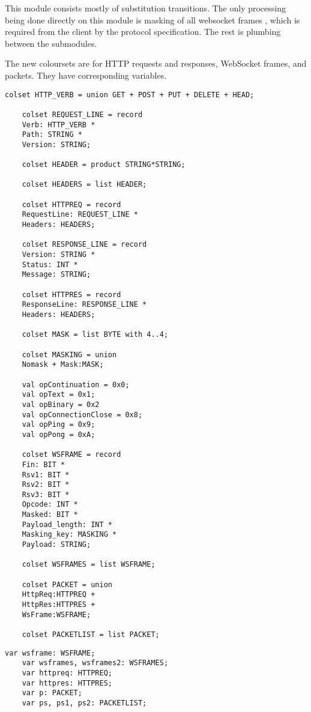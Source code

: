 	This module consists mostly of substitution transitions. The only processing
	being done directly on this module is masking of all websocket frames
	, which is required from the client by the
	protocol specification.
	The rest is plumbing between the submodules.
	
	The new coloursets are for HTTP requests and responses, WebSocket frames, and
	packets. They have corresponding variables. 
	
	\begin{lstlisting}[label=lst:client_lib_colset,caption=Library colour
	sets,gobble=1]
	colset HTTP_VERB = union GET + POST + PUT + DELETE + HEAD;
	
	colset REQUEST_LINE = record
	Verb: HTTP_VERB *
	Path: STRING *
	Version: STRING;
	
	colset HEADER = product STRING*STRING;
	
	colset HEADERS = list HEADER;
	
	colset HTTPREQ = record
	RequestLine: REQUEST_LINE *
	Headers: HEADERS;
	
	colset RESPONSE_LINE = record
	Version: STRING *
	Status: INT *
	Message: STRING;
	
	colset HTTPRES = record
	ResponseLine: RESPONSE_LINE *
	Headers: HEADERS;
	
	colset MASK = list BYTE with 4..4;
	
	colset MASKING = union
	Nomask + Mask:MASK;
	
	val opContinuation = 0x0;
	val opText = 0x1;
	val opBinary = 0x2
	val opConnectionClose = 0x8;
	val opPing = 0x9;
	val opPong = 0xA;
	
	colset WSFRAME = record
	Fin: BIT *
	Rsv1: BIT *
	Rsv2: BIT *
	Rsv3: BIT *
	Opcode: INT *
	Masked: BIT *
	Payload_length: INT *
	Masking_key: MASKING *
	Payload: STRING;
	
	colset WSFRAMES = list WSFRAME;
	
	colset PACKET = union 
	HttpReq:HTTPREQ + 
	HttpRes:HTTPRES +
	WsFrame:WSFRAME;

	colset PACKETLIST = list PACKET;
	\end{lstlisting}
	
	\begin{lstlisting}[label=lst:client_lib_vars,caption=Library
	variables,gobble=1]
	var wsframe: WSFRAME;
	var wsframes, wsframes2: WSFRAMES;
	var httpreq: HTTPREQ;
	var httpres: HTTPRES;
	var p: PACKET;
	var ps, ps1, ps2: PACKETLIST;
	\end{lstlisting}
	
